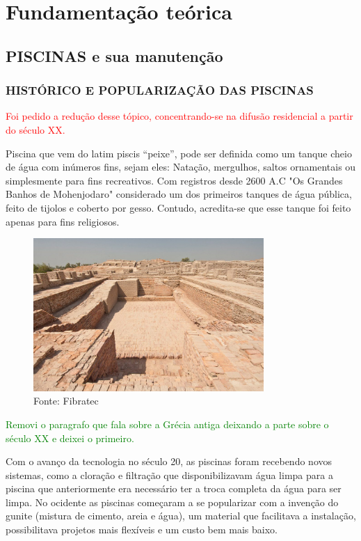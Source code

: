 \chapter{Fundamentação teórica}

\section{PISCINAS e sua manutenção}

    \subsection{HISTÓRICO E POPULARIZAÇÃO DAS PISCINAS}

        \textcolor{red}{Foi pedido a redução desse tópico, concentrando-se na difusão residencial a partir do século XX.}
    
        Piscina que vem do latim piscis “peixe”, pode ser definida como um tanque cheio de água com inúmeros fins, sejam eles: Natação, mergulhos, saltos ornamentais ou simplesmente para fins recreativos\cite{piscinaOquee}. Com registros desde 2600 A.C "Os Grandes Banhos de Mohenjodaro" considerado um dos primeiros tanques de água pública, feito de tijolos e coberto por gesso. Contudo, acredita-se que esse tanque foi feito apenas para fins religiosos.
         \begin{figure}[H]
         	\centering
         	\caption{ }  
        	\centering
         	\label{fig:cont}
        	\includegraphics[width=0.78\textwidth]{imagens/primeiraPiscina.png}
        	\caption*{Fonte: Fibratec}
         \end{figure}

         \textcolor{green}{Removi o paragrafo que fala sobre a Grécia antiga deixando a parte sobre o século XX e deixei o primeiro.}
        
        Com o avanço da tecnologia no século 20, as piscinas foram recebendo novos sistemas, como a cloração e filtração que disponibilizavam água limpa para a piscina que anteriormente era necessário ter a troca completa da água para ser limpa. No ocidente as piscinas começaram a se popularizar com a invenção do gunite (mistura de cimento, areia e água), um material que facilitava a instalação, possibilitava projetos mais flexíveis e um custo bem mais baixo\cite{piscinaHistoria}.

